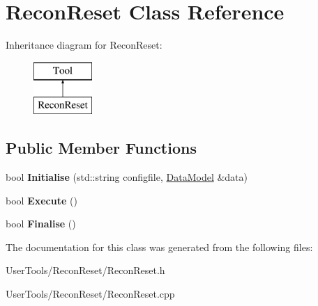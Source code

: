 \hypertarget{classReconReset}{\section{Recon\-Reset Class Reference}
\label{classReconReset}
}
Inheritance diagram for Recon\-Reset\-:\begin{figure}[H]
\begin{center}
\leavevmode
\includegraphics[height=2.000000cm]{classReconReset}
\end{center}
\end{figure}
\subsection*{Public Member Functions}
\begin{DoxyCompactItemize}
\item 
\hypertarget{classReconReset_af692157504b2a84938ccd651c8dbbd96}{bool {\bfseries Initialise} (std\-::string configfile, \hyperlink{classDataModel}{Data\-Model} \&data)}\label{classReconReset_af692157504b2a84938ccd651c8dbbd96}

\item 
\hypertarget{classReconReset_a299f661de185811285d6b5bedfeb8320}{bool {\bfseries Execute} ()}\label{classReconReset_a299f661de185811285d6b5bedfeb8320}

\item 
\hypertarget{classReconReset_a1f5f4c8170fee66f5f68609c88f85046}{bool {\bfseries Finalise} ()}\label{classReconReset_a1f5f4c8170fee66f5f68609c88f85046}

\end{DoxyCompactItemize}


The documentation for this class was generated from the following files\-:\begin{DoxyCompactItemize}
\item 
User\-Tools/\-Recon\-Reset/Recon\-Reset.\-h\item 
User\-Tools/\-Recon\-Reset/Recon\-Reset.\-cpp\end{DoxyCompactItemize}
